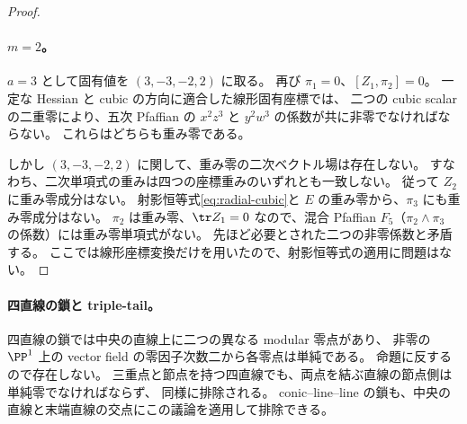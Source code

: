 \begin{proof}
\paragraph{$m=2$。}
$a=3$ として固有値を $(3,-3,-2,2)$ に取る。
再び $\pi_1=0$、$[Z_1,\pi_2]=0$。
一定な Hessian と cubic の方向に適合した線形固有座標では、
二つの cubic scalar の二重零により、五次 Pfaffian の
$x^2z^3$ と $y^2w^3$ の係数が共に非零でなければならない。
これらはどちらも重み零である。

しかし $(3,-3,-2,2)$ に関して、重み零の二次ベクトル場は存在しない。
すなわち、二次単項式の重みは四つの座標重みのいずれとも一致しない。
従って $Z_2$ に重み零成分はない。
射影恒等式\eqref{eq:radial-cubic}と $E$ の重み零から、$\pi_3$ にも重み零成分はない。
$\pi_2$ は重み零、$\tr Z_1=0$ なので、混合 Pfaffian
$F_5$（$\pi_2\wedge\pi_3$ の係数）には重み零単項式がない。
先ほど必要とされた二つの非零係数と矛盾する。
ここでは線形座標変換だけを用いたので、射影恒等式の適用に問題はない。
\end{proof}

\paragraph{四直線の鎖と triple-tail。}
四直線の鎖では中央の直線上に二つの異なる modular 零点があり、
非零の $\PP^1$ 上の vector field の零因子次数二から各零点は単純である。
命題に反するので存在しない。
三重点と節点を持つ四直線でも、両点を結ぶ直線の節点側は単純零でなければならず、
同様に排除される。
conic--line--line の鎖も、中央の直線と末端直線の交点にこの議論を適用して排除できる。
